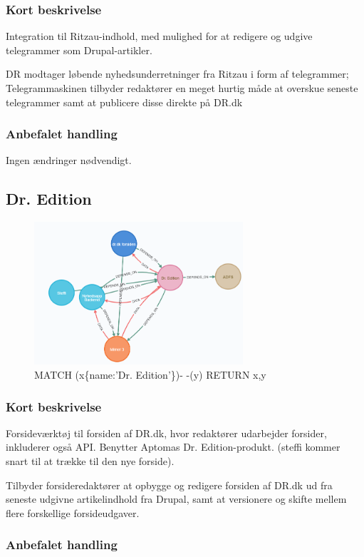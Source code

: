 \documentclass{article}
\begin{document}
\subsubsection*{Kort beskrivelse}
Integration til Ritzau-indhold, med mulighed for at redigere og udgive telegrammer som Drupal-artikler.	

DR modtager løbende nyhedsunderretninger fra Ritzau i form af telegrammer; Telegrammaskinen tilbyder redaktører en meget hurtig måde at overskue seneste telegrammer samt at publicere disse direkte på DR.dk
\subsubsection*{Anbefalet handling}
Ingen ændringer nødvendigt.


\subsection{Dr. Edition}
\begin{figure}[h]
\includegraphics[width=220pt]{DrEdition.PNG}
\caption{MATCH (x\{name:'Dr. Edition'\})- -(y) RETURN x,y}
\end{figure}
\subsubsection*{Kort beskrivelse}
Forsideværktøj til forsiden af DR.dk, hvor redaktører udarbejder forsider, inkluderer også API. Benytter Aptomas Dr. Edition-produkt. (steffi kommer snart til at trække til den nye forside). 

Tilbyder forsideredaktører at opbygge og redigere forsiden af DR.dk ud fra seneste udgivne artikelindhold fra Drupal, samt at versionere og skifte mellem flere forskellige forsideudgaver.
\subsubsection*{Anbefalet handling}
\end{document}
